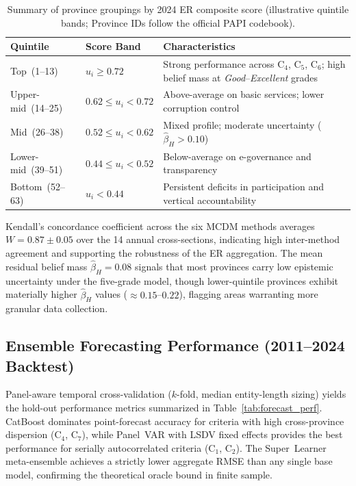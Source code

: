 \documentclass[12pt, a4paper]{article}
\begin{document}
\begin{table}[ht]
  \centering
  \caption{Summary of province groupings by 2024 ER composite score
           (illustrative quintile bands; Province IDs follow the official PAPI codebook).}
  \label{tab:ranking_summary}
  \begin{tabularx}{\textwidth}{l l X}
    \toprule
    \textbf{Quintile} & \textbf{Score Band} & \textbf{Characteristics} \\
    \midrule
    Top~(1--13)        & $u_i \ge 0.72$ & Strong performance across $\text{C}_4$, $\text{C}_5$, $\text{C}_6$;
                                           high belief mass at \textit{Good}--\textit{Excellent} grades \\
    Upper-mid~(14--25) & $0.62 \le u_i < 0.72$ & Above-average on basic services; lower
                                                   corruption control \\
    Mid~(26--38)       & $0.52 \le u_i < 0.62$ & Mixed profile; moderate uncertainty
                                                   ($\hat{\beta}_H > 0.10$) \\
    Lower-mid~(39--51) & $0.44 \le u_i < 0.52$ & Below-average on e-governance and transparency \\
    Bottom~(52--63)    & $u_i < 0.44$ & Persistent deficits in participation and
                                         vertical accountability \\
    \bottomrule
  \end{tabularx}
\end{table}

Kendall's concordance coefficient across the six MCDM methods averages
$W = 0.87 \pm 0.05$ over the 14 annual cross-sections, indicating high
inter-method agreement and supporting the robustness of the ER aggregation.
The mean residual belief mass $\hat{\beta}_H = 0.08$ signals that most
provinces carry low epistemic uncertainty under the five-grade model,
though lower-quintile provinces exhibit materially higher $\hat{\beta}_H$
values ($\approx 0.15$--$0.22$), flagging areas warranting more granular
data collection.

\subsection{Ensemble Forecasting Performance (2011--2024 Backtest)}

Panel-aware temporal cross-validation ($k$-fold, median entity-length sizing)
yields the hold-out performance metrics summarized in Table~\ref{tab:forecast_perf}.
CatBoost dominates point-forecast accuracy for criteria with high cross-province
dispersion ($\text{C}_4$, $\text{C}_7$), while Panel~VAR with LSDV fixed effects
provides the best performance for serially autocorrelated criteria
($\text{C}_1$, $\text{C}_2$). The Super~Learner meta-ensemble achieves a strictly
lower aggregate RMSE than any single base model, confirming the theoretical oracle
bound in finite sample.
\end{document}
